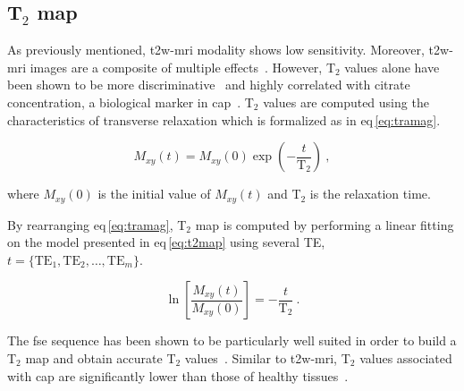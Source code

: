 \subsection{T$_2$ map} \label{subsec:chp2:imaging:t2}
As previously mentioned, \ac{t2w}-\ac{mri} modality shows low sensitivity.
Moreover, \ac{t2w}-\ac{mri} images are a composite of multiple
effects~\cite{Hegde2013}.
However, T$_2$ values alone have been shown to be more
discriminative~\cite{Liu2011} and highly correlated with citrate concentration,
a biological marker in \ac{cap}~\cite{Liney1996,Liney1997}.
T$_2$ values are computed using the characteristics of transverse relaxation
which is formalized as in \acs{eq}\,\eqref{eq:tramag}.

\begin{equation}
  M_{xy}(t) = M_{xy}(0) \exp \left( - \frac{t}{\text{T}_2} \right) \ ,
  \label{eq:tramag}
\end{equation}

\noindent where $M_{xy}(0)$ is the initial value of $M_{xy}(t)$ and T$_2$ is
the relaxation time.

By rearranging \acs{eq}\,\eqref{eq:tramag}, T$_2$ map is computed by performing
a linear fitting on the model presented in \acs{eq}\,\eqref{eq:t2map} using
several TE, $t=\{ \text{TE}_1,\text{TE}_2, \dotsc ,\text{TE}_m \}$.

\begin{equation}
  \ln \left[ \frac{M_{xy}(t)}{M_{xy}(0)} \right] = - \frac{t}{\text{T}_2} \ .
  \label{eq:t2map}
\end{equation}

The \Ac{fse} sequence has been shown to be particularly well suited in order to
build a T$_2$ map and obtain accurate T$_2$ values~\cite{Liney1996a}.
Similar to \ac{t2w}-\ac{mri}, T$_2$ values associated with \ac{cap} are
significantly lower than those of healthy tissues~\cite{Liney1996,Gibbs2001}.

